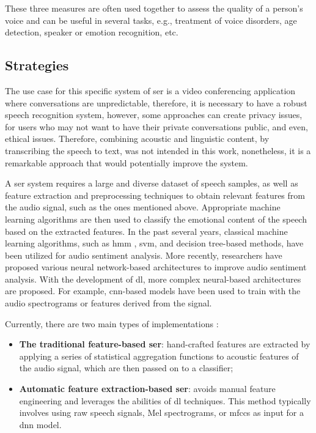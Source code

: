 These three measures are often used together to assess the quality of a person's voice and can be useful in several tasks, e.g., treatment of voice disorders, age detection, speaker or emotion recognition, etc.

\subsection{Strategies}

The use case for this specific system of \ac{ser} is a video conferencing application where conversations are unpredictable, therefore, it is necessary to have a robust speech recognition system, however, some approaches can create privacy issues, for users who may not want to have their private conversations public, and even, ethical issues. Therefore, combining acoustic and linguistic content, by transcribing the speech to text, was not intended in this work, nonetheless, it is a remarkable approach that would potentially improve the system.

A \ac{ser} system requires a large and diverse dataset of speech samples, as well as feature extraction and preprocessing techniques to obtain relevant features from the audio signal, such as the ones mentioned above. Appropriate machine learning algorithms are then used to classify the emotional content of the speech based on the extracted features. In the past several years, classical machine learning algorithms, such as \ac{hmm} \cite{1220939}, \ac{svm}, and decision tree-based methods, have been utilized for audio sentiment analysis. More recently, researchers have proposed various neural network-based architectures to improve audio sentiment analysis. With the development of \ac{dl}, more complex neural-based architectures are proposed. For example, \ac{cnn}-based models have been used to train with the audio spectrograms or features derived from the signal.

Currently, there are two main types of implementations \cite{Zhao2018}:
\begin{itemize}
    \item \textbf{The traditional feature-based \ac{ser}}: hand-crafted features are extracted by applying a series of statistical aggregation functions to acoustic features of the audio signal, which are then passed on to a classifier;
    \item \textbf{Automatic feature extraction-based \ac{ser}}: avoids manual feature engineering and leverages the abilities of \ac{dl} techniques. This method typically involves using raw speech signals, Mel spectrograms, or \ac{mfccs} as input for a \ac{dnn} model.
\end{itemize}


